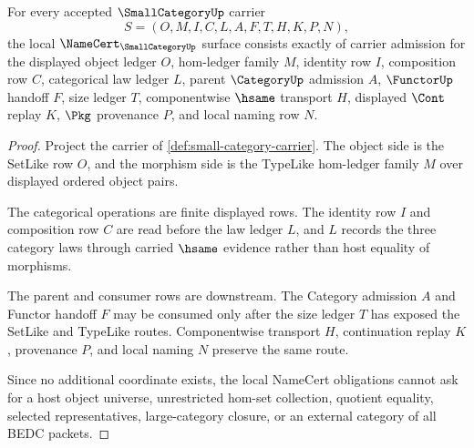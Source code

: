\begin{theorem}
\label{thm:small-category-namecert-obligations}
For every accepted $\SmallCategoryUp$ carrier
$$
S=(O,M,I,C,L,A,F,T,H,K,P,N),
$$
the local $\NameCert_{\SmallCategoryUp}$ surface consists exactly of carrier admission for the displayed object ledger $O$, hom-ledger family $M$, identity row $I$, composition row $C$, categorical law ledger $L$, parent $\CategoryUp$ admission $A$, $\FunctorUp$ handoff $F$, size ledger $T$, componentwise $\hsame$ transport $H$, displayed $\Cont$ replay $K$, $\Pkg$ provenance $P$, and local naming row $N$.
\end{theorem}
\begin{proof}
Project the carrier of \autoref{def:small-category-carrier}. The object side is the SetLike row $O$, and the morphism side is the TypeLike hom-ledger family $M$ over displayed ordered object pairs.

The categorical operations are finite displayed rows. The identity row $I$ and composition row $C$ are read before the law ledger $L$, and $L$ records the three category laws through carried $\hsame$ evidence rather than host equality of morphisms.

The parent and consumer rows are downstream. The Category admission $A$ and Functor handoff $F$ may be consumed only after the size ledger $T$ has exposed the SetLike and TypeLike routes. Componentwise transport $H$, continuation replay $K$, provenance $P$, and local naming $N$ preserve the same route.

Since no additional coordinate exists, the local NameCert obligations cannot ask for a host object universe, unrestricted hom-set collection, quotient equality, selected representatives, large-category closure, or an external category of all BEDC packets.
\end{proof}

